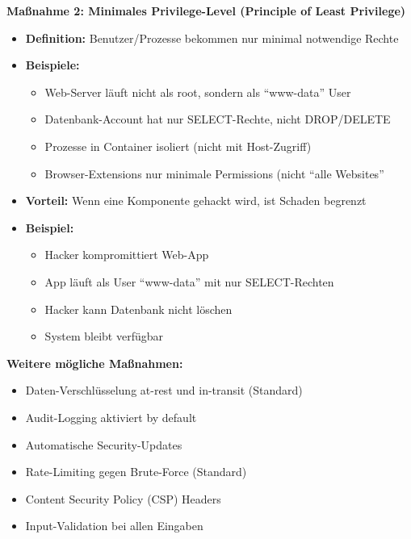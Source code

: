 \documentclass[12pt,a4paper]{article}
\begin{document}
\begin{tcolorbox}[colback=solutionbg, colframe=black!30]

\textbf{Maßnahme 2: Minimales Privilege-Level (Principle of Least Privilege)}

\begin{itemize}
    \item \textbf{Definition:} Benutzer/Prozesse bekommen nur minimal notwendige Rechte
    \item \textbf{Beispiele:}
    \begin{itemize}
        \item Web-Server läuft nicht als root, sondern als ``www-data'' User
        \item Datenbank-Account hat nur SELECT-Rechte, nicht DROP/DELETE
        \item Prozesse in Container isoliert (nicht mit Host-Zugriff)
        \item Browser-Extensions nur minimale Permissions (nicht ``alle Websites''
    \end{itemize}
    \item \textbf{Vorteil:} Wenn eine Komponente gehackt wird, ist Schaden begrenzt
    \item \textbf{Beispiel:}
    \begin{itemize}
        \item Hacker kompromittiert Web-App
        \item App läuft als User ``www-data'' mit nur SELECT-Rechten
        \item Hacker kann Datenbank nicht löschen
        \item System bleibt verfügbar
    \end{itemize}
\end{itemize}

\textbf{Weitere mögliche Maßnahmen:}

\begin{itemize}
    \item Daten-Verschlüsselung at-rest und in-transit (Standard)
    \item Audit-Logging aktiviert by default
    \item Automatische Security-Updates
    \item Rate-Limiting gegen Brute-Force (Standard)
    \item Content Security Policy (CSP) Headers
    \item Input-Validation bei allen Eingaben
\end{itemize}

\end{tcolorbox}
\end{document}
